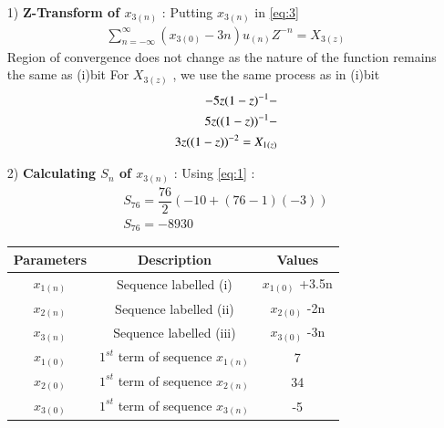 \documentclass[journal,12pt,twocolumn]{IEEEtran}
\theoremstyle{remark}
\begin{document}
\begin{enumerate}
\item[1)] 
\textbf{Z-Transform of $x_{3(n)}$} :
Putting $x_{3(n)}$ in \eqref{eq:3}\vspace{0.05cm}
\begin{align}
\sum_{n=-\infty}^{\infty}(x_{3(0)} -3n)u_{(n)}Z^{-n} =X_{3(z)}
\end{align}
Region of convergence does not change as the nature of the function remains the same as (i)bit\vspace{0.05cm}
For $X_{3(z)}$ , we use the same process as in (i)bit\vspace{0.05cm}
\begin{align}
  \notag -5z(1-z)^{-1}-\\
\notag 5z((1-z))^{-1}-\\
       3z((1-z))^{-2}=X_{1(z)}
\end{align}
\item[2)]
\textbf{Calculating $S_n$ of $x_{3(n)}$} :
Using \eqref{eq:1} :\vspace{0.05cm}
\begin{align}
    S_{76}=\dfrac{76}{2}(-10+(76-1)(-3))\\
   S_{76}=-8930
    \end{align}

  \vspace{2cm}
 \begin{center}
\begin{tabular}{ |c|c|c| } 
 \hline
 Parameters & Description & Values    \\
 \hline
  $x_{1(n)}$ & Sequence labelled (i) &  $x_{1(0)}$ +3.5n\\
  $x_{2(n)}$ &  Sequence labelled (ii) & $x_{2(0)}$ -2n \\
  $x_{3(n)}$ &  Sequence labelled (iii) & $x_{3(0)}$ -3n \\
   $x_{1(0)}$ & $1^{st}$ term of sequence $x_{1(n)}$ & 7 \\
     $x_{2(0)}$ & $1^{st}$ term of sequence $x_{2(n)}$& 34 \\
     $x_{3(0)}$ & $1^{st}$ term of sequence $x_{3(n)}$ & -5 \\
 \hline
\end{tabular}
\centering
\captionsetup{TABLE 1 : PARAMETERS , DESCRIPTIONS AND VALUES }
\end{center}
\end{enumerate}
\end{document}
